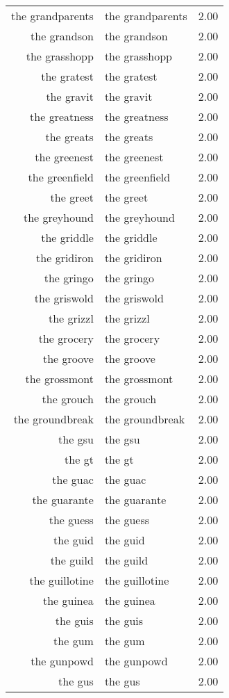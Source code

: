 \begin{table}[ht]
\begin{tabular}{rlr}
  the grandparents & the grandparents & 2.00 \\ 
  the grandson & the grandson & 2.00 \\ 
  the grasshopp & the grasshopp & 2.00 \\ 
  the gratest & the gratest & 2.00 \\ 
  the gravit & the gravit & 2.00 \\ 
  the greatness & the greatness & 2.00 \\ 
  the greats & the greats & 2.00 \\ 
  the greenest & the greenest & 2.00 \\ 
  the greenfield & the greenfield & 2.00 \\ 
  the greet & the greet & 2.00 \\ 
  the greyhound & the greyhound & 2.00 \\ 
  the griddle & the griddle & 2.00 \\ 
  the gridiron & the gridiron & 2.00 \\ 
  the gringo & the gringo & 2.00 \\ 
  the griswold & the griswold & 2.00 \\ 
  the grizzl & the grizzl & 2.00 \\ 
  the grocery & the grocery & 2.00 \\ 
  the groove & the groove & 2.00 \\ 
  the grossmont & the grossmont & 2.00 \\ 
  the grouch & the grouch & 2.00 \\ 
  the groundbreak & the groundbreak & 2.00 \\ 
  the gsu & the gsu & 2.00 \\ 
  the gt & the gt & 2.00 \\ 
  the guac & the guac & 2.00 \\ 
  the guarante & the guarante & 2.00 \\ 
  the guess & the guess & 2.00 \\ 
  the guid & the guid & 2.00 \\ 
  the guild & the guild & 2.00 \\ 
  the guillotine & the guillotine & 2.00 \\ 
  the guinea & the guinea & 2.00 \\ 
  the guis & the guis & 2.00 \\ 
  the gum & the gum & 2.00 \\ 
  the gunpowd & the gunpowd & 2.00 \\ 
  the gus & the gus & 2.00 \\ 

\end{tabular}
\end{table}
